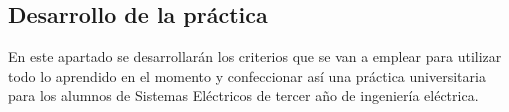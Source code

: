 \subsection{Desarrollo de la práctica}
\label{subsec:practica}

En este apartado se desarrollarán los criterios que se van a emplear para utilizar todo lo aprendido en el momento y confeccionar así una práctica universitaria para los alumnos de Sistemas Eléctricos de tercer año de ingeniería eléctrica.